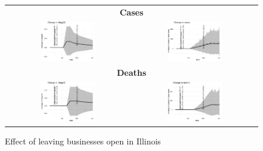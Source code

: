 \documentclass[11pt,reqno,letter]{amsart}
\theoremstyle{definition}
\begin{document}
\begin{figure}[h]
  \caption{Effect of leaving businesses open in Illinois \label{fig:IL-nb}}
  \begin{minipage}{\linewidth}
    \centering
    \begin{tabular}{cc}
      \multicolumn{2}{c}{\textbf{Cases}} \\
      \includegraphics[width=0.45\textwidth]{tables_and_figures/Illinois-nb-dgrowth_v1}
      &
        \includegraphics[width=0.45\textwidth]{tables_and_figures/Illinois-nb-dcases_v1} \\
      \multicolumn{2}{c}{\textbf{Deaths}} \\
           \includegraphics[width=0.45\textwidth]{tables_and_figures/Illinois-nb-dgrowth_deaths_v1}
      &       \includegraphics[width=0.45\textwidth]{tables_and_figures/Illinois-nb-dcases_deaths_v1}    \end{tabular}
  \end{minipage}
\end{figure}
\end{document}
